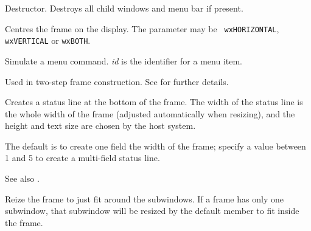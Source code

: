 
Destructor. Destroys all child windows and menu bar if present.



Centres the frame on the display. The parameter may be {\tt
wxHORIZONTAL}, {\tt wxVERTICAL} or {\tt wxBOTH}.



Simulate a menu command. {\it id} is the identifier for a menu item.



Used in two-step frame construction. See \rtfsp
for further details.

\label{wxframecreatestatusline}


Creates a status line at the bottom of the frame. The width of the
status line is the whole width of the frame (adjusted automatically when
resizing), and the height and text size are chosen by the host system.

The default is to create one field the width of the frame; specify a
value between 1 and 5 to create a multi-field status line.

See also .



Reize the frame to just fit around the subwindows. If a frame has only
one subwindow, that subwindow will be resized by the default \rtfsp
member to fit inside the frame.

\label{wxframegetmenubar}


